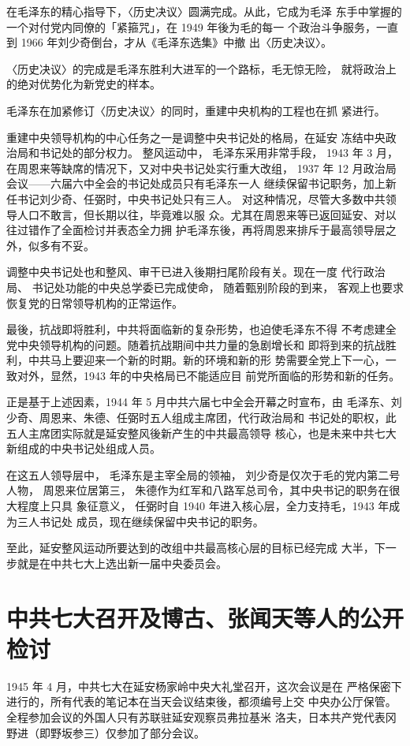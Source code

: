 在毛泽东的精心指导下，〈历史决议〉圆满完成。从此，它成为毛泽
东手中掌握的一个对付党内同僚的「紧箍咒」，在 1949 年後为毛的每一
个政治斗争服务，一直到 1966 年刘少奇倒台，才从《毛泽东选集》中撤
出〈历史决议〉。

〈历史决议〉的完成是毛泽东胜利大进军的一个路标，毛无惊无险，
就将政治上的绝对优势化为新党史的样本。

毛泽东在加紧修订〈历史决议〉的同时，重建中央机构的工程也在抓
紧进行。

重建中央领导机构的中心任务之一是调整中央书记处的格局，在延安
冻结中央政治局和书记处的部分权力。
整风运动中，
毛泽东采用非常手段，
1943 年 3 月，在周恩来等缺席的情况下，又对中央书记处实行重大改组，
1937 年 12 月政治局会议——六届六中全会的书记处成员只有毛泽东一人
继续保留书记职务，加上新任书记刘少奇、任弼时，中央书记处只有三人。
对这种情况，尽管大多数中共领导人口不敢言，但长期以往，毕竟难以服
众。尤其在周恩来等已返回延安、对以往过错作了全面检讨并表态全力拥
护毛泽东後，再将周恩来排斥于最高领导层之外，似多有不妥。

调整中央书记处也和整风、审干已进入後期扫尾阶段有关。现在一度
代行政治局、
书记处功能的中央总学委已完成使命，
随着甄别阶段的到来，
客观上也要求恢复党的日常领导机构的正常运作。

最後，抗战即将胜利，中共将面临新的复杂形势，也迫使毛泽东不得
不考虑建全党中央领导机构的问题。随着抗战期间中共力量的急剧增长和
即将到来的抗战胜利，中共马上要迎来一个新的时期。新的环境和新的形
势需要全党上下一心，一致对外，显然，1943 年的中央格局已不能适应目
前党所面临的形势和新的任务。

正是基于上述因素，1944 年 5 月中共六届七中全会开幕之时宣布，由
毛泽东、刘少奇、周恩来、朱德、任弼时五人组成主席团，代行政治局和
书记处的职权，此五人主席团实际就是延安整风後新产生的中共最高领导
核心，也是未来中共七大新组成的中央书记处组成人员。

在这五人领导层中，
毛泽东是主宰全局的领袖，
刘少奇是仅次于毛的党内第二号人物，
周恩来位居第三，
朱德作为红军和八路军总司令，其中央书记的职务在很大程度上只具
象征意义，
任弼时自 1940 年进入核心层，全力支持毛，1943 年成为三人书记处
成员，现在继续保留中央书记的职务。

至此，延安整风运动所要达到的改组中共最高核心层的目标已经完成
大半，下一步就是在中共七大上选出新一届中央委员会。

\section{中共七大召开及博古、张闻天等人的公开检讨}

1945 年 4 月，中共七大在延安杨家岭中央大礼堂召开，这次会议是在
严格保密下进行的，所有代表的笔记本在当天会议结束後，都须编号上交
中央办公厅保管。全程参加会议的外国人只有苏联驻延安观察员弗拉基米
洛夫，日本共产党代表冈野进（即野坂参三）仅参加了部分会议。

